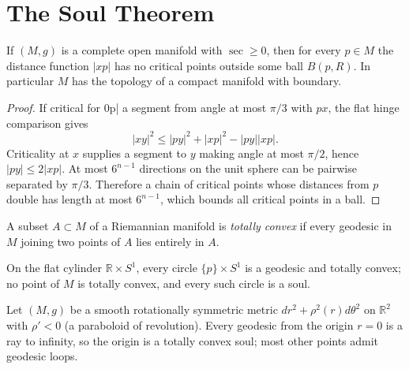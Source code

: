 \section{The Soul Theorem}

\begin{lemma}
  \label{lem:pet-ch12-gromov-critical-point-estimate}
  If $(M,g)$ is a complete open manifold with $\sec\ge0$, then for every $p\in M$
  the distance function $|xp|$ has no critical points outside some ball
  $B(p,R)$. In particular $M$ has the topology of a compact manifold with
  boundary.
\end{lemma}
\begin{proof}
  \sketch
  If  critical for 0\cdot p| a segment from   angle at
  most \(\pi/3\) with \(px\), the flat hinge comparison gives
  \[ |xy|^2\le |py|^2+|xp|^2-|py||xp|. \]
  Criticality at \(x\) supplies a segment to \(y\) making angle at most
  \(\pi/2\), hence \( |py|\le2|xp|\). At most \(6^{n-1}\) directions on
  the unit sphere can be pairwise separated by \(\pi/3\). Therefore a chain
  of critical points whose distances from \(p\) double has length at most
  \(6^{n-1}\), which bounds all critical points in a ball.
\end{proof}

\begin{definition}
  \label{def:pet-ch12-totally-convex}
  A subset $A\subset M$ of a Riemannian manifold is \emph{totally convex} if
  every geodesic in $M$ joining two points of $A$ lies entirely in $A$.
\end{definition}

\begin{example}
  \label{ex:pet-ch12-totally-convex-cylinder}
  On the flat cylinder $\mathbb{R}\times S^1$, every circle $\{p\}\times S^1$ is
  a geodesic and totally convex; no point of $M$ is totally convex, and every
  such circle is a soul.
\end{example}

\begin{example}
  \label{ex:pet-ch12-totally-convex-paraboloid}
  Let $(M,g)$ be a smooth rotationally symmetric metric
  $dr^2+\rho^2(r)d\theta^2$ on $\mathbb{R}^2$ with $\rho'<0$ (a paraboloid of
  revolution). Every geodesic from the origin $r=0$ is a ray to infinity, so the
  origin is a totally convex soul; most other points admit geodesic loops.
\end{example}

